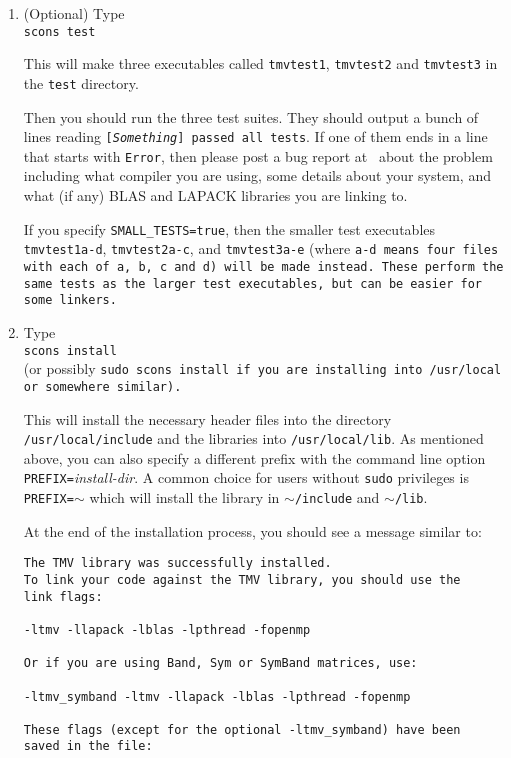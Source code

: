 \begin{enumerate}
\item (Optional) Type\\
\texttt{scons test}

This will make three executables called \texttt{tmvtest1}, 
\texttt{tmvtest2} and \texttt{tmvtest3} in the \texttt{test} directory.

Then you should run the three test suites.
They should output a bunch of lines reading \texttt{[{\em Something}] passed all tests}.
If one of them ends in a line that starts with \texttt{Error}, 
then please post a bug report at \myissues\ about the problem including what compiler
you are using, some details about your system, and what (if any) BLAS and LAPACK
libraries you are linking to.

If you specify \texttt{SMALL\_TESTS=true}, then the smaller test executables
\texttt{tmvtest1a-d}, \texttt{tmvtest2a-c}, and \texttt{tmvtest3a-e} (where \tt{a-d} means 
four files with each of \tt{a}, \tt{b}, \tt{c} and \tt{d})
will be made instead.
These perform the same tests as the larger test executables, but can be easier
for some linkers.

\item Type\\
\texttt{scons install}\\
(or possibly \tt{sudo scons install} if you are installing into \tt{/usr/local} or somewhere similar).

This will install the necessary header files into the directory \texttt{/usr/local/include} and the libraries
into \texttt{/usr/local/lib}.  As mentioned above, you can also specify a different prefix 
with the command line option \texttt{PREFIX=}\emph{install-dir}.  A common choice for users
without \texttt{sudo} privileges is \texttt{PREFIX=$\sim$} which will install the library in \texttt{$\sim$/include}
and \texttt{$\sim$/lib}.

At the end of the installation process, you should see a message similar to:
\begin{verbatim}
The TMV library was successfully installed.  
To link your code against the TMV library, you should use the 
link flags: 

-ltmv -llapack -lblas -lpthread -fopenmp

Or if you are using Band, Sym or SymBand matrices, use: 

-ltmv_symband -ltmv -llapack -lblas -lpthread -fopenmp

These flags (except for the optional -ltmv_symband) have been
saved in the file:


\end{verbatim}
\end{enumerate}
